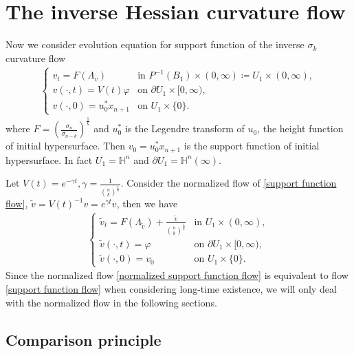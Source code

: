 \documentclass[reqno]{amsart}
\theoremstyle{remark}
\theoremstyle{definition}
\numberwithin{equation}{section}
\begin{document}
\section{The inverse Hessian curvature flow}

Now we consider evolution equation for support function of the inverse $\sigma_k$ curvature flow
\begin{align}
    \begin{cases}
    v_t = F(\Lambda_{v}) & \text{in } P^{-1}(B_1) \times (0, \infty) \coloneqq U_1 \times (0, \infty), \\[4pt]
    v(\cdot, t) = V(t) \varphi & \text{on } \partial U_1 \times [0, \infty), \\[4pt]
    v(\cdot, 0) = u_0^* x_{n+1} & \text{on } U_1 \times \{0\}. \label{support function flow}
    \end{cases}
  \end{align}
where $F=\left( \frac{\sigma_n}{\sigma_{n-k}} \right)^{\frac{1}{k}}$ and $u_0^*$ is the Legendre transform of $u_0$, the height function of initial hypersurface. Then $v_0=u_0^* x_{n+1}$ is the support function of initial hypersurface. In fact $U_1 = \mathbb{H}^n$ and $\partial U_1 = \mathbb{H}^n(\infty)$.

Let $V(t) = e^{-\gamma t},  \gamma = \frac{1}{\binom{n}{k}^{\frac{1}{k}}}$.
Consider the normalized flow of \eqref{support function flow}, $\tilde{v}=V(t)^{-1}v=e^{\gamma t}v$, then we have 
\begin{align}
    \begin{cases}
    \tilde{v}_t = F(\Lambda_{\tilde{v}}) + \frac{\tilde{v}}{\binom{n}{k}^{\frac{1}{k}}} & \text{in } U_1 \times (0, \infty), \\[4pt]
    \tilde{v}(\cdot, t) = \varphi & \text{on } \partial U_1 \times [0, \infty), \\[4pt]
    \tilde{v}(\cdot, 0) = v_0 & \text{on } U_1 \times \{0\}. \label{normalized support function flow}
    \end{cases}
\end{align}
Since the normalized flow \eqref{normalized support function flow} is equivalent to flow \eqref{support function flow} when considering long-time existence, we will only deal with the normalized flow in the following sections.


\subsection{Comparison principle}
\end{document}
